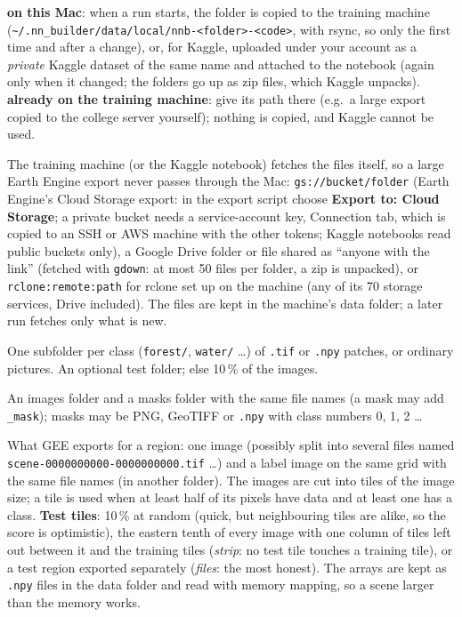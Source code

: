 \documentclass[11pt,a4paper]{article}
\newcommand{\ui}[1]{\textbf{\textsf{#1}}}
\newcommand{\file}[1]{\texttt{#1}}
\begin{document}
\begin{description}[nosep]
  \item[Where the files are.] \ui{on this Mac}: when a run starts, the folder is copied to the training machine
        (\file{\textasciitilde/.nn\_builder/data/local/nnb-<folder>-<code>}, with rsync, so only the first time and after a change), or, for
        Kaggle, uploaded under your account as a \emph{private} Kaggle dataset of the same name and attached to the notebook (again only
        when it changed; the folders go up as zip files, which Kaggle unpacks). \ui{already on the training machine}: give its path there
        (e.g.\ a large export copied to the college server yourself); nothing is copied, and Kaggle cannot be used.
  \item[In the cloud.] The training machine (or the Kaggle notebook) fetches the files itself, so a large Earth Engine export never passes
        through the Mac: \texttt{gs://bucket/folder} (Earth Engine's Cloud Storage export: in the export script choose \ui{Export to: Cloud
        Storage}; a private bucket needs a service-account key, Connection tab, which is copied to an SSH or AWS machine with the other
        tokens; Kaggle notebooks read public buckets only), a Google Drive folder or file shared as ``anyone with the link'' (fetched with
        \texttt{gdown}: at most 50 files per folder, a zip is unpacked), or \texttt{rclone:remote:path} for rclone set up on the machine
        (any of its 70 storage services, Drive included). The files are kept in the machine's data folder; a later run fetches only what
        is new.
  \item[Classification.] One subfolder per class (\file{forest/}, \file{water/} \dots) of \file{.tif} or \file{.npy} patches, or ordinary
        pictures. An optional test folder; else 10\,\% of the images.
  \item[Segmentation: images + masks.] An images folder and a masks folder with the same file names (a mask may add \file{\_mask}); masks
        may be PNG, GeoTIFF or \file{.npy} with class numbers 0, 1, 2 \dots
  \item[Segmentation: a large image and a label image.] What GEE exports for a region: one image (possibly split into several files named
        \file{scene-0000000000-0000000000.tif} \dots) and a label image on the same grid with the same file names (in another folder). The
        images are cut into tiles of the image size; a tile is used when at least half of its pixels have data and at least one has a
        class. \ui{Test tiles}: 10\,\% at random (quick, but neighbouring tiles are alike, so the score is optimistic), the eastern
        tenth of every image with one column of tiles left out between it and the training tiles (\emph{strip}: no test tile touches a
        training tile), or a test region exported separately (\emph{files}: the most honest). The arrays are kept as \file{.npy} files in the data folder and read with memory mapping, so a
        scene larger than the memory works.
\end{description}
\end{document}
